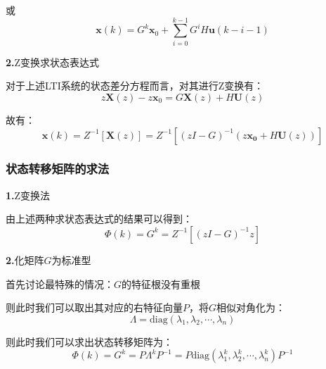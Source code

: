 或
\begin{equation*}
    \bm{x}(k) = G^k \bm{x}_0 + \sum_{i=0}^{k-1} G^i H \bm{u}(k-i-1)
\end{equation*}

\noindent \textbf{2.}Z变换求状态表达式

对于上述LTI系统的状态差分方程而言，对其进行Z变换有：
\begin{equation*}
    z \bm{X}(z) - z\bm{x}_0 = G \bm{X}(z) + H \bm{U}(z)
\end{equation*}

故有：
\begin{equation*}
    \bm{x}(k) = Z^{-1}[\bm{X}(z)] = Z^{-1}[(zI - G)^{-1} (z \bm{x_0} + H \bm{U}(z))]
\end{equation*}

\subsubsection{状态转移矩阵的求法}

\noindent \textbf{1.}Z变换法

由上述两种求状态表达式的结果可以得到：
\begin{equation*}
    \Phi(k) = G^k = Z^{-1} [(zI - G )^{-1} z]
\end{equation*}

\noindent \textbf{2.}化矩阵$G$为标准型

首先讨论最特殊的情况：$G$的特征根没有重根

则此时我们可以取出其对应的右特征向量$P$，将$G$相似对角化为：
\begin{equation*}
    \varLambda = \text{diag}(\lambda_1,\lambda_2,\cdots,\lambda_n)
\end{equation*}

则此时我们可以求出状态转移矩阵为：
\begin{equation*}
    \Phi(k) = G^k = P \varLambda^k P^{-1} = P \text{diag}(\lambda_1^k,\lambda_2^k,\cdots,\lambda_n^k) P^{-1}
\end{equation*}

